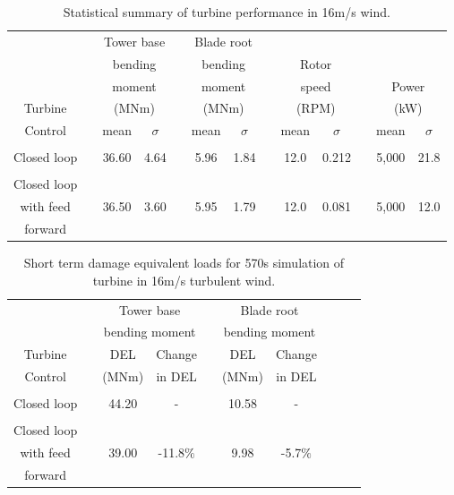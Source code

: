\begin{table}
\centering
\begin{tabular}{ c | c c c c c c c c c c c c}
\hline
\hline
	& & \multicolumn{2}{c}{Tower base}	& & \multicolumn{2}{c}{Blade root}		& & \\
	& & \multicolumn{2}{c}{bending}	& & \multicolumn{2}{c}{bending}		& &\multicolumn{2}{c}{Rotor}	& & \\
	& & \multicolumn{2}{c}{moment}	& & \multicolumn{2}{c}{moment}		& &\multicolumn{2}{c}{speed}		& &\multicolumn{2}{c}{Power} \\	
Turbine					& & \multicolumn{2}{c}{(MNm)}  					& & \multicolumn{2}{c}{(MNm)}	& & \multicolumn{2}{c}{(RPM)}	& & \multicolumn{2}{c}{(kW)}\\
\cline{3-4} \cline{6-7} \cline{9-10} \cline{12-13} 
Control & & mean & $\sigma$ & & mean & $\sigma$ & & mean & $\sigma$  & & mean & $\sigma$ \\
\hline
\\
Closed loop  & & 36.60 & 4.64  & & 5.96 & 1.84  && 12.0 & 0.212&& 5,000  & 21.8 \\
 \\
Closed loop\\
with feed  & & 36.50 & 3.60  & & 5.95 & 1.79 && 12.0 & 0.081  && 5,000  & 12.0 \\
forward\\
\hline
\hline
\end{tabular}
\caption{Statistical summary of turbine performance in 16m/s wind.}
\label{Table3-5}
\end{table}

\begin{table}
\centering
\begin{tabular}{ c | c c c c c c c c c}
\hline
\hline
					&&\multicolumn{2}{c}{Tower base}					&&\multicolumn{2}{c}{Blade	root} \\
					&&\multicolumn{2}{c}{bending moment}			&&\multicolumn{2}{c}{bending moment}\\
						\cline{3-4} 														\cline{6-7}
Turbine			&& DEL   	& Change										&& DEL  	& Change\\
Control			&& (MNm)  & in DEL 										&& (MNm)  & in DEL 	\\
\hline
\\
Closed loop  && 44.20 & - 													&& 10.58 & - \\
 \\
Closed loop\\
with feed  		&& 39.00 & -11.8$\%$ 									&& 9.98 & -5.7$\%$\\
forward\\
\hline
\hline
\end{tabular}
\caption{Short term damage equivalent loads for 570s simulation of turbine  in 16m/s turbulent wind.}
\label{Table3-6}
\end{table}

